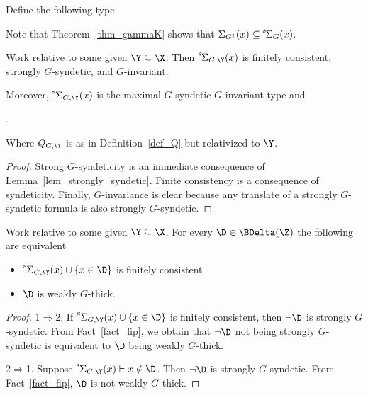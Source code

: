 Define the following type

\smallskip

Note that Theorem~\ref{thm_gammaK} shows that $\Sigma_{G^1}(x)\subseteq{\mathstrut}^{\rm s}\kern-.2ex\Sigma_G(x)$.

\begin{corollary}\label{corol_str_gen}
  Work relative to some given $\Y\subseteq\X$.
  Then ${\mathstrut}^{\rm s}\kern-.1ex\Sigma_{G,\Y}(x)$ is finitely consistent, strongly $G$-syndetic, and $G$-invariant.\smallskip

  Moreover, ${\mathstrut}^{\rm s}\kern-.1ex\Sigma_{G,\Y}(x)$ is the maximal $G$-syndetic $G$-invariant type and\medskip


  .\smallskip

  Where $Q_{G,\Y}$ is as in Definition~\ref{def_Q} but relativized to $\Y$.  
\end{corollary}

\begin{proof}
  Strong $G$-syndeticity is an immediate consequence of Lemma~\ref{lem_strongly_syndetic}.
  Finite consistency is a consequence of syndeticity.
  Finally, $G$-invariance is clear because any translate of a strongly $G$-syndetic formula is also strongly $G$-syndetic.
\end{proof}


\begin{corollary}\label{corol_q_w_pers}
  Work relative to some given $\Y\subseteq\X$.
  For every $\D\in\BDelta(\Z)$ the following are equivalent
  \begin{itemize}
    \item [1.] ${\mathstrut}^{\rm s}\kern-.1ex\Sigma_{G,\Y}(x)\cup\{x\in\D\}$ is finitely consistent
    \item [2.] $\D$ is weakly $G$-thick.
  \end{itemize}
\end{corollary}

\begin{proof}
  1$\Rightarrow$2. 
  If ${\mathstrut}^{\rm s}\kern-.1ex\Sigma_{G,\Y}(x)\cup\{x\in\D\}$ is finitely consistent, then $\neg\D$ is strongly $G$-syndetic.
  From Fact~\ref{fact_fip}, we obtain that $\neg\D$ not being strongly $G$-syndetic is equivalent to $\D$ being weakly $G$-thick.

  2$\Rightarrow$1.
  Suppose ${\mathstrut}^{\rm s}\kern-.1ex\Sigma_{G,\Y}(x)\vdash x\notin\D$.
  Then $\neg\D$ is strongly $G$-syndetic.
  From Fact~\ref{fact_fip}, $\D$ is not weakly $G$-thick.
\end{proof}

